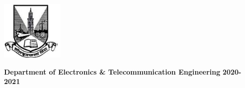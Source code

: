 \begin{center}
\includegraphics[width=30mm,scale=1]{22}


\end{center}
\begin{center}
	\textbf {Department of Electronics \& Telecommunication Engineering}
	\vspace{0.1cm}
	\linebreak \textbf {2020-2021}
\end{center}
